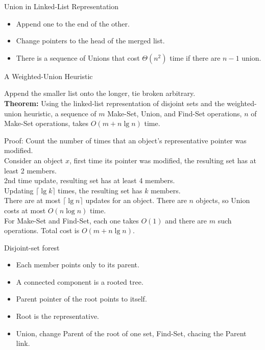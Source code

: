 \documentclass{beamer}
\begin{document}
\begin{frame}{}

\end{frame}

\begin{frame}{}
\centerline{\large Union in Linked-List Representation}
\begin{itemize}
\item Append one to the end of the other.
\item Change pointers to the head of the merged list.
\item There is a sequence of Unions that cost $\Theta(n^2)$ time if 
 there are $n-1$ union.  
\end{itemize}
\end{frame}

\begin{frame}{}

\centerline{\large A Weighted-Union Heuristic}
Append the smaller list onto the longer, tie broken arbitrary. \\
{\bf Theorem:} Using the linked-list representation of disjoint sets and the
 weighted-union heuristic, a sequence of $m$ Make-Set, Union, and 
Find-Set operations, $n$ of Make-Set operations, takes $O(m+n\lg n)$ time.
\end{frame}

\begin{frame}{}

Proof: 
Count the number of times that an object's representative
 pointer was modified.  \\
Consider an object $x$, first time its pointer was modified, the resulting
 set has at least 2 members.  \\
2nd time update, resulting set has at least 4 members.  \\
Updating $\lceil \lg k\rceil$ times, the resulting set has $k$ members.  \\
There are at most $\lceil \lg n\rceil$ updates for an object.  There are
$n$ objects, so Union costs at most $O(n\log n)$ time.  \\
For Make-Set and Find-Set, each one takes $O(1)$ and there are $m$
such operations.  Total cost is $O(m+n\lg n)$.
\end{frame}

\begin{frame}{}

\centerline{\Large Disjoint-set forest}
\begin{itemize}
\item Each member points only to its parent.
\item A connected component is a rooted tree.  
\item Parent pointer of the root points to itself.  
\item Root is the representative.  
\item Union, change Parent of the root of one set, Find-Set, chacing the
 Parent link.  
\end{itemize}
\end{frame}
\end{document}
